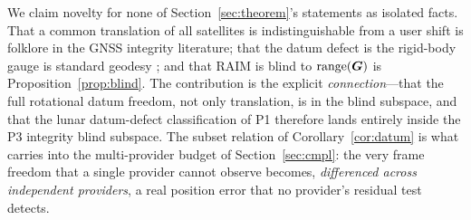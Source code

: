 \begin{remark}
\label{rem:synthesis}
We claim novelty for none of Section~\ref{sec:theorem}'s statements as isolated facts.
That a common translation of all satellites is indistinguishable from a user shift is
folklore in the GNSS integrity literature; that the datum defect is the rigid-body
gauge is standard geodesy \citep{baarda1973,teunissen2000}; and that RAIM is blind to
$\operatorname{range}(\bm{G})$ is Proposition~\ref{prop:blind}. The contribution is the explicit
\emph{connection}---that the full rotational datum freedom, not only translation, is in
the blind subspace, and that the lunar datum-defect classification of P1
\citep{baweja2026datum} therefore lands entirely inside the P3 integrity blind subspace.
The subset relation of Corollary~\ref{cor:datum} is what carries into the multi-provider
budget of Section~\ref{sec:cmpl}: the very frame freedom that a single provider cannot
observe becomes, \emph{differenced across independent providers}, a real position error
that no provider's residual test detects.
\end{remark}
